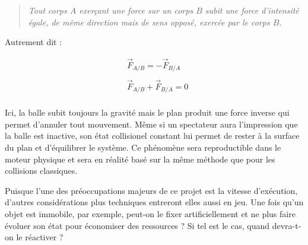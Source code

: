 \begin{quote}
\textit{Tout corps $A$ exerçant une force sur un corps $B$ subit une force
d'intensité égale, de même direction mais de sens opposé, exercée par
le corps $B$.}
\end{quote}

Autrement dit :

\begin{align*}
  &\vec{F}_{A/B} = -\vec{F}_{B/A} \\ \\
  &\vec{F}_{A/B} + \vec{F}_{B/A} = 0 \\
\end{align*}

Ici, la balle subit toujours la gravité mais le plan produit une force
inverse qui permet d'annuler tout mouvement. Même si un spectateur
aura l'impression que la balle est inactive, son état collisionel
constant lui permet de rester à la surface du plan et d'équilibrer le
système. Ce phénomène sera reproductible dans le moteur physique et
sera en réalité basé sur la même méthode que pour les collisions
classiques.

Puisque l'une des préoccupations majeurs de ce projet est la vitesse
d'exécution, d'autres considérations plus techniques entreront elles
aussi en jeu. Une fois qu'un objet est immobile, par exemple, peut-on
le fixer artificiellement et ne plus faire évoluer son état pour
économiser des ressources ? Si tel est le cas, quand devra-t-on le
réactiver ?

